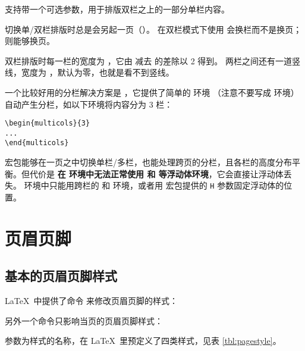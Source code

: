 支持带一个可选参数，用于排版双栏之上的一部分单栏内容。

切换单/双栏排版时总是会另起一页（）。
在双栏模式下使用  会换栏而不是换页； 则能够换页。

双栏排版时每一栏的宽度为 ，它由  减去  的差除以 2 得到。
两栏之间还有一道竖线，宽度为 ，默认为零，也就是看不到竖线。

一个比较好用的分栏解决方案是 ，它提供了简单的  环境
（注意不要写成  环境）自动产生分栏，如以下环境将内容分为 3 栏：
\begin{verbatim}
\begin{multicols}{3}
...
\end{multicols}
\end{verbatim}

 宏包能够在一页之中切换单栏/多栏，也能处理跨页的分栏，且各栏的高度分布平衡。但代价是%
\textbf{在  环境中无法正常使用  和  等浮动体环境}，它会直接让浮动体丢失。
 环境中只能用跨栏的  和  环境，或者用  宏包提供的 \texttt{H} 参数固定浮动体的位置。

\section{页眉页脚}\label{sec:pagestyle}

\subsection{基本的页眉页脚样式}\label{subsec:basic-pagesyle}

\LaTeX\ 中提供了命令  来修改页眉页脚的样式：
\begin{command}
\end{command}
另外一个命令只影响当页的页眉页脚样式：
\begin{command}
\end{command}

 参数为样式的名称，在 \LaTeX\ 里预定义了四类样式，见表 \ref{tbl:pagestyle}。


